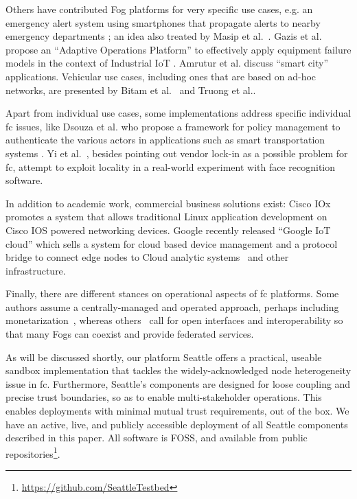 Others have contributed Fog platforms for very specific use cases, e.g.
an emergency alert system using smartphones that propagate alerts to nearby
emergency departments \cite{7134091}; an idea also treated by Masip
et al.~\cite{masip-bruin_foggy_2016}. Gazis et al. propose an ``Adaptive
Operations Platform''
to effectively apply equipment failure models in the context of Industrial
\gls{IoT} \cite{gazis_components_2015}.
Amrutur et al.\cite{amrutur_open_2017} discuss ``smart city''
applications. Vehicular use cases, including ones that are based on
ad-hoc networks, are presented by Bitam et al.~\cite{bitam_vanet-cloud:_2015}
and Truong et al.\cite{truong_software_2015}.

Apart from individual use cases, some implementations address specific individual
\gls{fc} issues, like Dsouza et al. who propose a framework for
policy management to authenticate the various actors in applications
such as smart
transportation systems \cite{dsouza_policy-driven_2014}.
Yi et al.~\cite{yi_fog_2015}, besides pointing out vendor lock-in
as a possible problem for \gls{fc}, attempt to exploit locality
in a real-world experiment with face recognition software.

In addition to academic work, commercial business solutions exist:
Cisco IOx~\cite{cisco_iox} promotes a
system that allows traditional Linux application development on
Cisco IOS powered networking devices.
Google recently released ``Google \gls{IoT} cloud'' which sells a system for
cloud based device management and a protocol bridge to connect edge nodes to
Cloud analytic systems~\cite{google_iot_core} and other infrastructure.

Finally, there are different stances on operational aspects of
\gls{fc} platforms. Some authors assume a centrally-managed and
operated approach, perhaps including monetarization~\cite{mahmud_fog_2016,7868354}, whereas others~\cite{belli_design_2015}
call for open interfaces and interoperability so that many
Fogs can coexist and provide federated services.

As will be discussed shortly, our platform Seattle offers a practical,
useable sandbox implementation that tackles the widely-acknowledged
node heterogeneity issue in \gls{fc}. Furthermore, Seattle's components
are designed for loose coupling and precise trust boundaries, so as to
enable multi-stakeholder operations. This enables deployments with
minimal mutual trust requirements, out of the box.
We have an active, live, and publicly accessible deployment of all
Seattle components described in this paper. All software is
\acrlong{FOSS}, and available from public
repositories\footnote{\url{https://github.com/SeattleTestbed}}.


